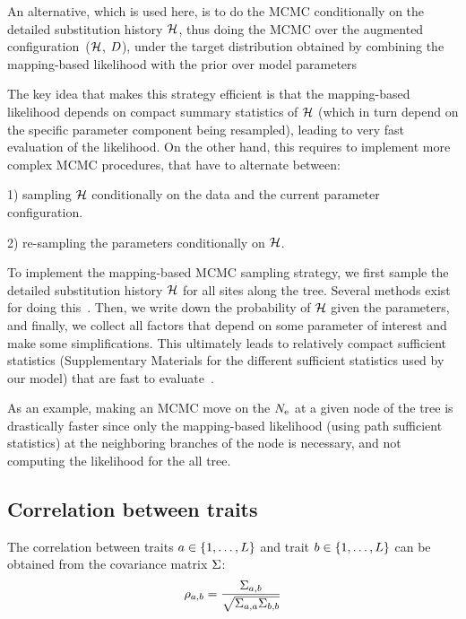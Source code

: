 An alternative, which is used here, is to do the \acrshort{MCMC} conditionally on the detailed \gls{substitution} history $\mathcal{H}$, thus doing the \acrshort{MCMC} over the augmented configuration~($\mathcal{H}$, $D$), under the target distribution obtained by combining the mapping-based \gls{likelihood} with the \gls{prior} over model parameters

The key idea that makes this strategy efficient is that the mapping-based \gls{likelihood} depends on
compact summary statistics of $\mathcal{H}$ (which in turn depend on the specific parameter component
being resampled), leading to very fast evaluation of the \gls{likelihood}.
On the other hand, this requires to implement more complex \acrshort{MCMC} procedures, that have to alternate between:

1) sampling $\mathcal{H}$ conditionally on the data and the current parameter configuration.

2) re-sampling the parameters conditionally on $\mathcal{H}$.

To implement the mapping-based \acrshort{MCMC} sampling strategy, we first sample the detailed \gls{substitution} history $\mathcal{H}$ for all sites along the tree.
Several methods exist for doing this~\citep{Nielsen2002,Rodrigue2008}.
Then, we write down the probability of $\mathcal{H}$ given the parameters, and finally, we collect all factors that depend on some parameter of interest and make some simplifications.
This ultimately leads to relatively compact sufficient statistics (Supplementary Materials for the different sufficient statistics used by our model) that are fast to evaluate~\citep{Irvahn2014,Davydov2016}.

As an example, making an \acrshort{MCMC} move on the $N_{\mathrm{e}}$ at a given node of the tree is drastically faster since only the mapping-based \gls{likelihood} (using path sufficient statistics) at the neighboring branches of the node is necessary, and not computing the \gls{likelihood} for the all tree.
\\

\subsection{Correlation between traits}
\label{sec:Correlation}
The correlation between traits $a \in \{1, \hdots, L\}$ and trait $b \in \{1, \hdots, L\}$ can be obtained from the covariance matrix $\Sigma$:
\begin{equation}
\rho_{a, b} = \dfrac{\Sigma_{a, b}}{\sqrt{\Sigma_{a, a} \Sigma_{b, b}}}
\end{equation}

